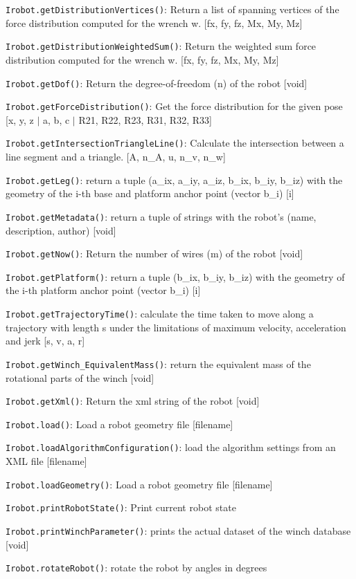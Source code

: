 \documentclass[11pt,a4paper,onepage,openany]{book}
\begin{document}
\texttt{Irobot.getDistributionVertices()}: Return a list of spanning vertices of the force distribution computed for the wrench w. [fx, fy, fz, Mx, My, Mz]

\texttt{Irobot.getDistributionWeightedSum()}: Return the weighted sum force distribution computed for the wrench w. [fx, fy, fz, Mx, My, Mz]

\texttt{Irobot.getDof()}: Return the degree-of-freedom (n) of the robot [void]

\texttt{Irobot.getForceDistribution()}: Get the force distribution for the given pose [x, y, z $|$ a, b, c $|$ R21, R22, R23, R31, R32, R33]

\texttt{Irobot.getIntersectionTriangleLine()}: Calculate the intersection between a line segment and a triangle. [A, n\_A, u, n\_v, n\_w]

\texttt{Irobot.getLeg()}: return a tuple (a\_ix, a\_iy, a\_iz, b\_ix, b\_iy, b\_iz) with the geometry of the i-th base and platform anchor point (vector b\_i) [i]

\texttt{Irobot.getMetadata()}: return a tuple of strings with the robot's (name, description, author) [void]

\texttt{Irobot.getNow()}: Return the number of wires (m) of the robot [void]

\texttt{Irobot.getPlatform()}: return a tuple (b\_ix, b\_iy, b\_iz) with the geometry of the i-th platform anchor point (vector b\_i) [i]

\texttt{Irobot.getTrajectoryTime()}: calculate the time taken to move along a trajectory with length s under the limitations of maximum velocity, acceleration and jerk [s, v, a, r]

\texttt{Irobot.getWinch\_EquivalentMass()}: return the equivalent mass of the rotational parts of the winch [void]

\texttt{Irobot.getXml()}: Return the xml string of the robot [void]

\texttt{Irobot.load()}: Load a robot geometry file [filename]

\texttt{Irobot.loadAlgorithmConfiguration()}: load the algorithm settings from an XML file [filename]

\texttt{Irobot.loadGeometry()}: Load a robot geometry file [filename]

\texttt{Irobot.printRobotState()}: Print current robot state

\texttt{Irobot.printWinchParameter()}: prints the actual dataset of the winch database [void]

\texttt{Irobot.rotateRobot()}: rotate the robot by angles in degrees
\end{document}

